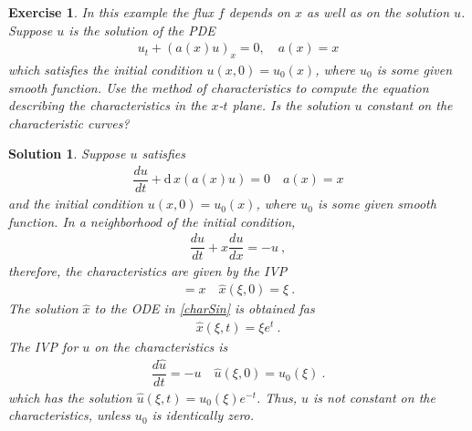 \documentclass[10pt,letterpaper]{article}
\newcommand{\dif}[1][]{\mathrm{d} {#1}\,}
\newcommand{\rb}[1]{ \left(  {#1} \right) }
\newcommand{\frb}[1]{ \left(  {#1} \right) }
\theoremstyle{break}
\newtheorem{exercise}{Exercise}
\newtheorem{mysolution}{Solution}
\newtheorem*{mysolutioninformation}{Solution Information}
\newenvironment{solution}{\begin{mysolution}}{\end{mysolution}} \newenvironment{solutioninformation}{\begin{mysolutioninformation}}{\end{mysolutioninformation}}
\begin{document}
\begin{exercise}
	In this example the flux $f$ depends on $x$ as well as on the solution $u$.
	Suppose $u$ is the solution of the PDE
	\begin{gather}%
		u_t +\rb{a(x)u}_x=0,
		\quad
		a(x)= x
	\end{gather}%
	which satisfies the initial condition $u(x,0)=u_0(x)$, where $u_0$ is some given smooth function.
	Use the method of characteristics to compute the equation describing the characteristics in the $x$-$t$ plane.
	Is the solution $u$ constant on the characteristic curves?
\end{exercise}

\begin{solution}
	Suppose $u$ satisfies
	\begin{gather}
		\dfrac{du}{dt}+\dif{}{x}\rb{a(x)u}=0
		\quad
		a(x)=x
	\end{gather}
	and the initial condition $u(x,0)=u_0(x)$, where $u_0$ is some given smooth function.
	In a neighborhood of the initial condition,
	\begin{gather}
		\dfrac{du}{dt}+x \dfrac{du}{dx}=-u\ ,
	\end{gather}
	therefore, the characteristics are given by the IVP
	\begin{gather} \label{charSin}
		=x
		\quad
		\hat x\frb{\xi,0}=\xi\ .
	\end{gather}
	The solution $\hat x$ to the ODE in \eqref{charSin} is obtained fas
	\begin{gather}
		\hat x\frb{\xi,t}=\xi e^t\ .
	\end{gather}
	The IVP for $u$ on the characteristics is
	\begin{gather}
		\dfrac{d\hat u}{dt}=-u
		\quad
		\hat u\frb{\xi,0}=u_0\frb{\xi}\ .
	\end{gather}
	which has the solution $\hat u(\xi,t) = u_0(\xi) e^{-t}$. Thus, $u$ is not constant on the characteristics, unless $u_0$ is identically zero.	
\end{solution}
\end{document}
